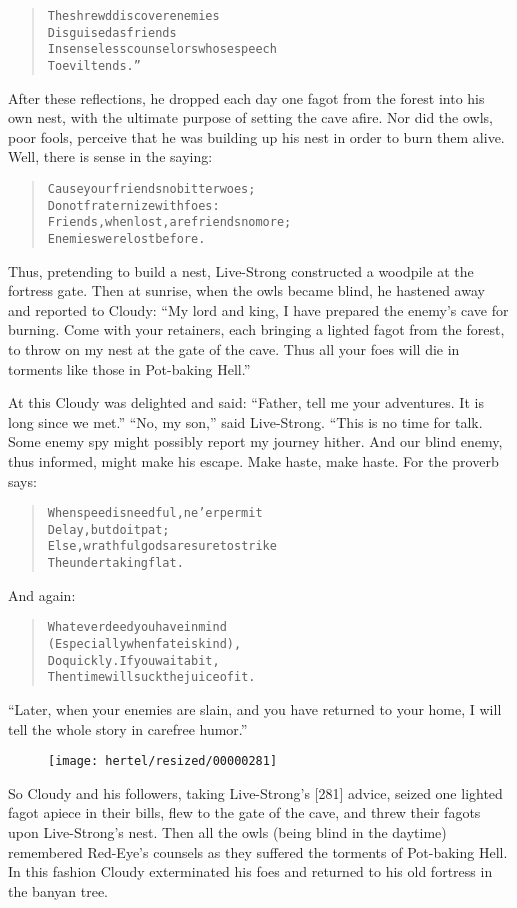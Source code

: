\documentclass[article, twoside, 10pt]{memoir}
\renewenvironment{verbatim}{%
\begin{quote}%
\vskip -10pt%
\begin{alltt}\normalfont\small}{\end{alltt}%
\end{quote}%
\vskip -10pt
} %
\begin{document}
\begin{verbatim}
The shrewd discover enemies
    Disguised as friends
In senseless counselors whose speech
    To evil tends.”
\end{verbatim}
After these reflections, he dropped each day one fagot from the
forest into his own nest, with the ultimate purpose of setting the
cave afire. Nor did the owls, poor fools, perceive that he was
building up his nest in order to burn them alive. Well, there is
sense in the saying:

\begin{verbatim}
Cause your friends no bitter woes;
Do not fraternize with foes:
Friends, when lost, are friends no more;
Enemies were lost before.
\end{verbatim}
Thus, pretending to build a nest, Live-Strong constructed a
woodpile at the fortress gate. Then at sunrise, when the owls
became blind, he hastened away and reported to Cloudy:
``My lord and king, I have prepared the enemy's cave for burning. Come with your retainers, each bringing a lighted fagot from the forest, to throw on my nest at the gate of the cave. Thus all your foes will die in torments like those in Pot-baking Hell.''

At this Cloudy was delighted and said:
``Father, tell me your adventures. It is long since we met.''
``No, my son,'' said Live-Strong. “This is no time for talk. Some
enemy spy might possibly report my journey hither. And our blind
enemy, thus informed, might make his escape. Make haste, make
haste. For the proverb says:

\begin{verbatim}
When speed is needful, ne'er permit
    Delay, but do it pat;
Else, wrathful gods are sure to strike
    The undertaking flat.
\end{verbatim}
And again:

\begin{verbatim}
Whatever deed you have in mind
(Especially when fate is kind),
Do quickly. If you wait a bit,
Then time will suck the juice of it.
\end{verbatim}
``Later, when your enemies are slain, and you have returned to your home, I will tell the whole story in carefree humor.''

\begin{figure}[p]\texttt{[image: hertel/resized/00000281]}\end{figure}So Cloudy and his followers, taking Live-Strong's [281] advice,
seized one lighted fagot apiece in their bills, flew to the gate of
the cave, and threw their fagots upon Live-Strong's nest. Then all
the owls (being blind in the daytime) remembered Red-Eye's counsels
as they suffered the torments of Pot-baking Hell. In this fashion
Cloudy exterminated his foes and returned to his old fortress in
the banyan tree.
\end{document}
